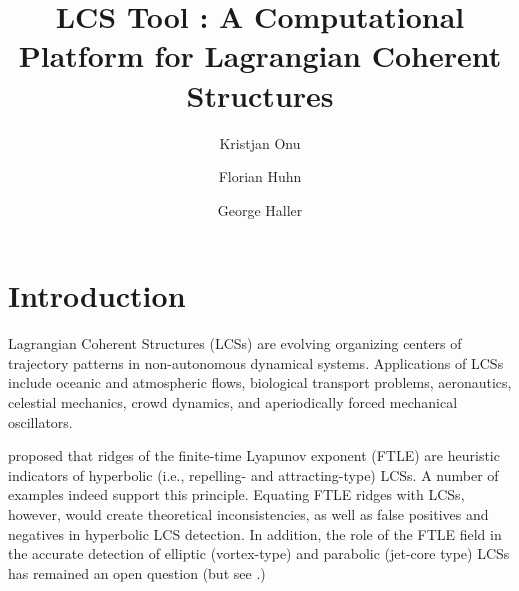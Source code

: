 \documentclass{article}
\title{LCS Tool : A Computational Platform for Lagrangian Coherent Structures}
\author{Kristjan Onu \and Florian Huhn \and George Haller}
\begin{document}

\maketitle


\tableofcontents

\section{Introduction}

Lagrangian Coherent Structures (LCSs) are evolving organizing centers of trajectory patterns in non-autonomous dynamical systems\parencite{haller00:_lagran,peacock13:_lagran,haller15:_langr_coher_struc}. Applications of LCSs include oceanic and atmospheric flows\parencite{beron-vera13:_objec_agulh,koh02:_hyper}, biological transport problems\parencite{wilson09:_lagran_reynol,tallapragada11:_lagran,huhn12:_south_indian_ocean_count_madag}, aeronautics\parencite{tang10:_accur_lagran_hong_kong_inter_airpor}, celestial mechanics\parencite{gawlik09:_lagran}, crowd dynamics\parencite{ali07:_lagran_partic_dynam_approac_crowd}, and aperiodically forced mechanical oscillators\parencite{hadjighasem13:_detec_kam}.

\textcite{haller01:_distin} proposed that ridges of the finite-time Lyapunov exponent (FTLE) are heuristic indicators of hyperbolic (i.e., repelling- and attracting-type) LCSs. A number of examples indeed support this principle\parencite{peacock13:_lagran}. Equating FTLE ridges with LCSs, however, would create theoretical inconsistencies, as well as false positives and negatives in hyperbolic LCS detection\parencite{haller11:_lagran_coher_struc,norgard12:_secon_lagran_coher_struc}. In addition, the role of the FTLE field in the accurate detection of elliptic (vortex-type) and parabolic (jet-core type) LCSs has remained an open question (but see \textcite{beron-vera10:_invar_lagran}.)
\end{document}
